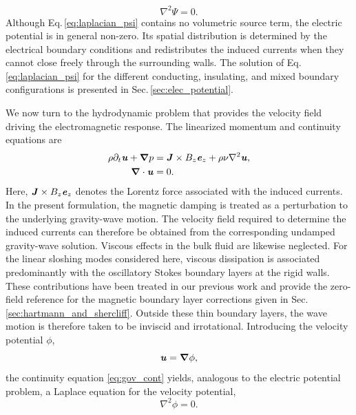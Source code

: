 \documentclass[aps,prfluids,reprint,superscriptaddress]{revtex4-2}
\newcommand{\h}[1]{\textbf{\textit{#1}}}
\begin{document}
\begin{equation}
	\nabla^2\Psi=0. \label{eq:laplacian_psi} 
\end{equation} 
Although Eq.\,\eqref{eq:laplacian_psi} contains no volumetric source term, the electric potential is in general non-zero. Its spatial distribution is determined by the electrical boundary conditions and redistributes the induced currents when they cannot close freely through the surrounding walls. The solution of Eq.\,\eqref{eq:laplacian_psi} for the different conducting, insulating, and mixed boundary configurations is presented in Sec.\,\ref{sec:elec_potential}.

We now turn to the hydrodynamic problem that provides the velocity field driving the electromagnetic response. The linearized momentum and continuity equations are \begin{subequations} 
\begin{align} 
\rho\partial_t\h u + \bm\nabla p &= \h J\times B_z\h e_z +\rho\nu\nabla^2\h u, \label{eq:gov_momentum} \\ 
\bm\nabla\cdot\h u &=0. \label{eq:gov_cont} 
\end{align} 
\end{subequations} 
Here, $\h J\times B_z\h e_z$ denotes the Lorentz force associated with the induced currents. In the present formulation, the magnetic damping is treated as a perturbation to the underlying gravity-wave motion. The velocity field required to determine the induced currents can therefore be obtained from the corresponding undamped gravity-wave solution. Viscous effects in the bulk fluid are likewise neglected. For the linear sloshing modes considered here, viscous dissipation is associated predominantly with the oscillatory Stokes boundary layers at the rigid walls. These contributions have been treated in our previous work \cite{Hegde2026} and provide the zero-field reference for the magnetic boundary layer corrections given in Sec.\,\ref{sec:hartmann_and_shercliff}. Outside these thin boundary layers, the wave motion is therefore taken to be inviscid and irrotational. Introducing the velocity potential $\phi$, 
\begin{equation} 
\h u=\bm\nabla\phi, 
\end{equation} 
the continuity equation \eqref{eq:gov_cont} yields, analogous to the electric potential problem, a Laplace equation for the velocity potential,
\begin{equation} 
\nabla^2\phi=0. \label{eq:laplacian_phi} 
\end{equation}
\end{document}
